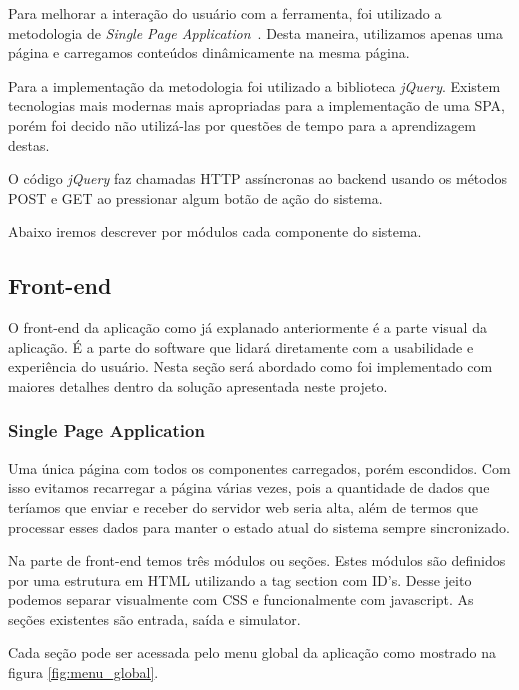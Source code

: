 	Para melhorar a interação do usuário com a ferramenta, foi utilizado a metodologia de \textit{Single Page Application}~\cite{mikowski2013single}. Desta maneira, utilizamos apenas uma página e carregamos conteúdos dinâmicamente na mesma página.

	Para a implementação da metodologia foi utilizado a biblioteca \textit{jQuery}. Existem tecnologias mais modernas mais apropriadas para a implementação de uma SPA, porém foi decido não utilizá-las por questões de tempo para a aprendizagem destas.

	O código \textit{jQuery} faz chamadas HTTP assíncronas ao backend usando os métodos POST e GET ao pressionar algum botão de ação do sistema. 

	Abaixo iremos descrever por módulos cada componente do sistema.
	
	\subsection{Front-end}
	
		O front-end da aplicação como já explanado anteriormente é a parte visual da aplicação. É a parte do software que lidará diretamente com a usabilidade e experiência do usuário. Nesta seção será abordado como foi implementado com maiores detalhes dentro da solução apresentada neste projeto.

		\subsubsection{Single Page Application}
		
			Uma única página com todos os componentes carregados, porém escondidos. Com isso evitamos recarregar a página várias vezes, pois a quantidade de dados que teríamos que  enviar e receber do servidor web seria alta, além de termos que processar esses dados para manter o estado atual do sistema sempre sincronizado.

			Na parte de front-end temos três módulos ou seções. Estes módulos são definidos por uma estrutura em HTML utilizando a tag section com ID's. Desse jeito podemos separar visualmente com CSS e funcionalmente com javascript. As seções existentes são entrada, saída e simulator.

			Cada seção pode ser acessada pelo menu global da aplicação como mostrado na figura \ref{fig:menu_global}.

